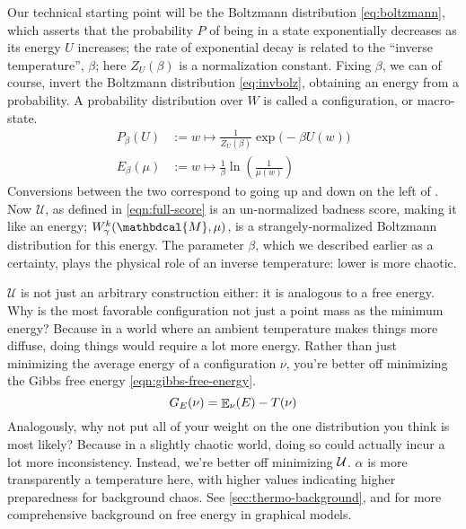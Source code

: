 \documentclass[letterpaper]{article} %
\theoremstyle{plain}
\theoremstyle{definition}
\theoremstyle{remark}
\let\H\relax
\DeclareMathOperator{\H}{\mathrm{H}} %
\DeclareMathOperator*{\E}{\mathbb{E}} %
\newcommand{\dg}[1]{\mathbdcal{#1}}
\begin{document}
Our technical starting point will be the Boltzmann distribution \eqref{eq:boltzmann}, which asserts that the probability $P$ of being in a state exponentially decreases as its energy $U$ increases; the rate of exponential decay is related to the ``inverse temperature'', $\beta$; here $Z_U(\beta)$ is a normalization constant. Fixing $\beta$, we can of course, invert the Boltzmann distribution \eqref{eq:invbolz}, obtaining an energy from a probability. A probability distribution over $W$ is called a configuration, or macro-state.
\begin{align}
 P_{\beta}(U) &:= w \mapsto  \frac{1}{Z_U(\beta)}\exp\Big(-\beta U(w)\Big) \label{eq:boltzmann} \\
	E_{\beta}(\mu) &:= w \mapsto \frac{1}{\beta} \ln \left(\frac{1}{\mu(w)}\right) \label{eq:invbolz}
\end{align}
Conversions between the two correspond to going up and down on the left of . 
Now $\mathcal U$, as defined in \eqref{eqn:full-score} is an un-normalized badness score, making it like an energy; $W^k_\gamma(\dg M, \mu)$, is a strangely-normalized Boltzmann distribution for this energy. The parameter $\beta$, which we described earlier as a certainty, plays the physical role of an inverse temperature: lower is more chaotic. 

$\mathcal U$ is not just an arbitrary construction either: it is analogous to a free energy. Why is the most favorable configuration not just a point mass as the minimum energy? Because in a world where an ambient temperature makes things more diffuse, doing things would require a lot more energy. Rather than just minimizing the average energy of a configuration $\nu$, you're better off minimizing the Gibbs free energy \eqref{eqn:gibbs-free-energy}. 
\begin{equation}
	G_E(\nu) = {\E}_\nu( E )  - T \H(\nu) \label{eqn:gibbs-free-energy}
\end{equation}
Analogously, why not put all of your weight on the one distribution you think is most likely? Because in a slightly chaotic world, doing so could actually incur a lot more inconsistency. Instead, we're better off minimizing $\cal U$. $\alpha$ is more transparently a temperature here, with higher values indicating higher preparedness for background chaos. 
%
See \ref{sec:thermo-background}, and
	\cite{bethe,friston2009free} for more comprehensive background
	on free energy 
in graphical models.
\end{document}
